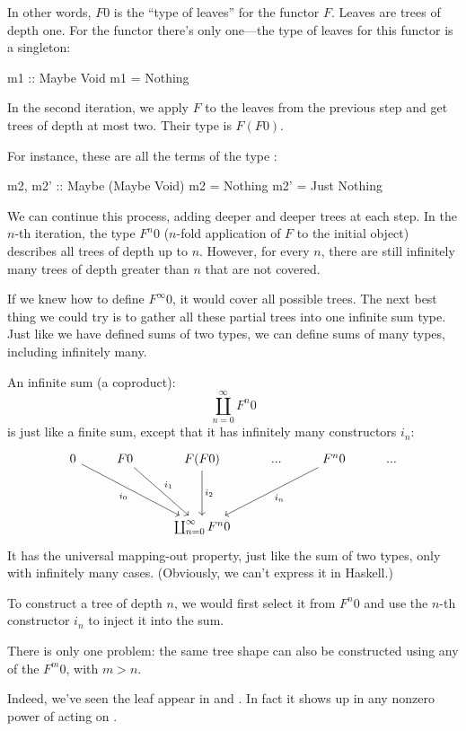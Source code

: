 \documentclass[DaoFP]{subfiles}
\begin{document}
In other words, $F 0$ is the ``type of leaves'' for the functor $F$. Leaves are trees of depth one. For the  functor there's only one---the type of leaves for this functor is a singleton:
\begin{haskell}
m1 :: Maybe Void
m1 = Nothing
\end{haskell}

In the second iteration, we apply $F$ to the leaves from the previous step and get trees of depth at most two. Their type is $F(F 0)$. 

For instance, these are all the terms of the type :
\begin{haskell}
m2, m2' :: Maybe (Maybe Void)
m2 = Nothing
m2' = Just Nothing
\end{haskell}

We can continue this process, adding deeper and deeper trees at each step. In the $n$-th iteration, the type $F^n 0$ ($n$-fold application of $F$ to the initial object) describes all trees of depth up to $n$. However, for every $n$, there are still infinitely many trees of depth greater than $n$ that are not covered. 

If we knew how to define $F^{\infty} 0$, it would cover all possible trees. The next best thing we could try is to gather all these partial trees into one infinite sum type. Just like we have defined sums of two types, we can define sums of many types, including infinitely many. 

An infinite sum (a coproduct):
$$ \coprod_{n = 0}^{\infty} F^n 0$$
is just like a finite sum, except that it has infinitely many constructors $i_n$:
\[
 \begin{tikzcd}
 0
 \arrow[ddrr, "i_0"']
 & F 0
  \arrow[ddr, "i_1"]
& F (F 0)
  \arrow[dd, "i_2"]
 & ...
 & F^n 0
  \arrow[ddll, "i_n"]
 & ...
 \\
 \\
 &&\coprod_{n = 0}^{\infty} F^n 0
  \end{tikzcd}
\]
It has the universal mapping-out property, just like the sum of two types, only with infinitely many cases. (Obviously, we can't express it in Haskell.)

To construct a tree of depth $n$, we would first select it from $F^n 0$ and use the $n$-th constructor $i_n$ to inject it into the sum. 

There is only one problem: the same tree shape can also be constructed using any of the $F^m 0$, with $m > n$. 

Indeed, we've seen the leaf  appear in  and . In fact it shows up in any nonzero power of  acting on . 
\end{document}
